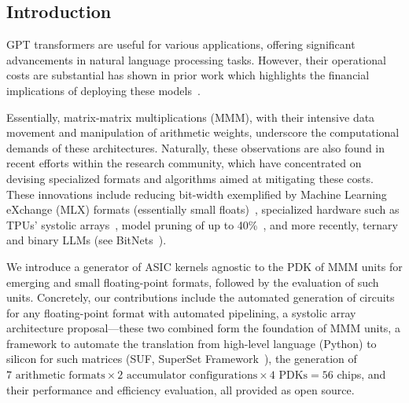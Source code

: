 %
%
%
%
%

\subsection{Introduction}
\label{sec:introduction}

GPT transformers are useful for various applications, offering significant advancements in natural language processing tasks.
However, their operational costs are substantial has shown in prior work which highlights the financial implications of deploying these models~\cite{luccioni2022estimating}.

Essentially, matrix-matrix multiplications (MMM), with their intensive data movement and manipulation of arithmetic weights, underscore the computational demands of these architectures.
Naturally, these observations are also found in recent efforts within the research community, which have concentrated on devising specialized formats and algorithms aimed at mitigating these costs.
These innovations include reducing bit-width exemplified by Machine Learning eXchange (MLX) formats (essentially small floats)~\cite{}, specialized hardware such as TPUs' systolic arrays~\cite{}, model pruning of up to 40\%~\cite{}, and more recently, ternary and binary LLMs (see BitNets~\cite{}).

We introduce a generator of ASIC kernels agnostic to the PDK of MMM units for emerging and small floating-point formats, followed by the evaluation of such units.
Concretely, our contributions include the automated generation of circuits for any floating-point format with automated pipelining, a systolic array architecture proposal—these two combined form the foundation of MMM units, a framework to automate the translation from high-level language (Python) to silicon for such matrices (SUF, SuperSet Framework~\cite{}), the generation of $7 \text{ arithmetic formats} \times 2 \text{ accumulator configurations} \times 4 \text{ PDKs} = 56$ chips, and their performance and efficiency evaluation, all provided as open source.
